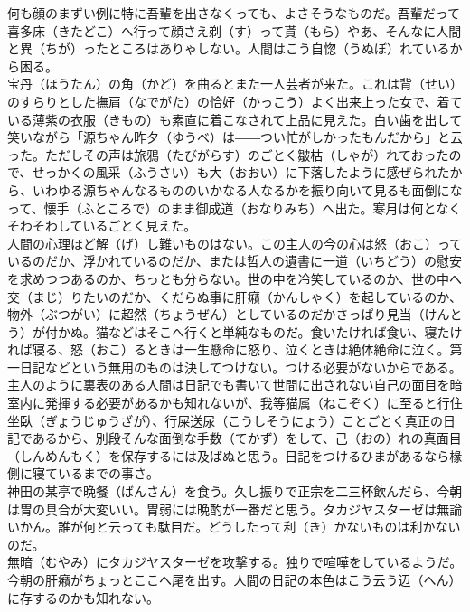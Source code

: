 \documentclass{book}
\begin{document}
何も顔のまずい例に特に吾輩を出さなくっても、よさそうなものだ。吾輩だって喜多床（きたどこ）へ行って顔さえ剃（す）って貰（もら）やあ、そんなに人間と異（ちが）ったところはありゃしない。人間はこう自惚（うぬぼ）れているから困る。\\

宝丹（ほうたん）の角（かど）を曲るとまた一人芸者が来た。これは背（せい）のすらりとした撫肩（なでがた）の恰好（かっこう）よく出来上った女で、着ている薄紫の衣服（きもの）も素直に着こなされて上品に見えた。白い歯を出して笑いながら「源ちゃん昨夕（ゆうべ）は――つい忙がしかったもんだから」と云った。ただしその声は旅鴉（たびがらす）のごとく皺枯（しゃが）れておったので、せっかくの風采（ふうさい）も大（おおい）に下落したように感ぜられたから、いわゆる源ちゃんなるもののいかなる人なるかを振り向いて見るも面倒になって、懐手（ふところで）のまま御成道（おなりみち）へ出た。寒月は何となくそわそわしているごとく見えた。\\

人間の心理ほど解（げ）し難いものはない。この主人の今の心は怒（おこ）っているのだか、浮かれているのだか、または哲人の遺書に一道（いちどう）の慰安を求めつつあるのか、ちっとも分らない。世の中を冷笑しているのか、世の中へ交（まじ）りたいのだか、くだらぬ事に肝癪（かんしゃく）を起しているのか、物外（ぶつがい）に超然（ちょうぜん）としているのだかさっぱり見当（けんとう）が付かぬ。猫などはそこへ行くと単純なものだ。食いたければ食い、寝たければ寝る、怒（おこ）るときは一生懸命に怒り、泣くときは絶体絶命に泣く。第一日記などという無用のものは決してつけない。つける必要がないからである。主人のように裏表のある人間は日記でも書いて世間に出されない自己の面目を暗室内に発揮する必要があるかも知れないが、我等猫属（ねこぞく）に至ると行住坐臥（ぎょうじゅうざが）、行屎送尿（こうしそうにょう）ことごとく真正の日記であるから、別段そんな面倒な手数（てかず）をして、己（おの）れの真面目（しんめんもく）を保存するには及ばぬと思う。日記をつけるひまがあるなら椽側に寝ているまでの事さ。\\

神田の某亭で晩餐（ばんさん）を食う。久し振りで正宗を二三杯飲んだら、今朝は胃の具合が大変いい。胃弱には晩酌が一番だと思う。タカジヤスターゼは無論いかん。誰が何と云っても駄目だ。どうしたって利（き）かないものは利かないのだ。\\

無暗（むやみ）にタカジヤスターゼを攻撃する。独りで喧嘩をしているようだ。今朝の肝癪がちょっとここへ尾を出す。人間の日記の本色はこう云う辺（へん）に存するのかも知れない。\\
\end{document}
